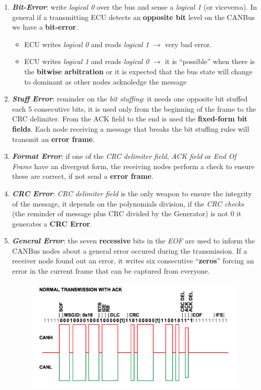 \begin{enumerate}[nosep]
    \item \textbf{\textit{Bit-Error}}: write \textit{logical 0} over the bus and sense a \textit{logical 1} (or viceversa). In general if a transmitting ECU detects an \textbf{opposite bit} level on the CANBus we have a \textbf{bit-error}.
    \begin{itemize}[nosep]
        \item ECU writes \textit{logical 0} and reads \textit{logical 1} $\rightarrow$ very bad error.
        \item ECU writes \textit{logical 1} and reads \textit{logical 0} $\rightarrow$ it is ``possible'' when there is the \textbf{bitwise arbitration} or it is expected that the bus state will change to dominant as other nodes acknoledge the message
    \end{itemize}
    \item \textbf{\textit{Stuff Error}}: reminder on the \textit{bit stuffing}: it needs one opposite bit stuffed each 5 consecutive bits, it is used only from the beginning of the frame to the CRC delimiter. From the ACK field to the end is used the \textbf{fixed-form bit fields}. Each node receiving a message that breaks the bit stuffing rules will transmit an \textbf{error frame}.
    \item \textbf{\textit{Format Error}}: if one of the \textit{CRC delimiter field}, \textit{ACK field} or \textit{End Of Frame} have an divergent form, the receiving nodes perform a check to ensure these are correct, if not send a \textbf{error frame}.
    \item \textbf{\textit{CRC Error}}: \textit{CRC delimiter field} is the only weapon to ensure the integrity of the message, it depends on the polynomials division, if the \textit{CRC checks} (the reminder of message plus CRC divided by the Generator) is not $0$ it generates a \textbf{CRC Error}.
    \item \textbf{\textit{General Error}}: the seven \textbf{recessive} bits in the \textit{EOF} are used to inform the CANBus nodes about a general error occured during the transmission. If a receiver node found out an error, it writes six consecutive ``\textbf{zeros}'' forcing an error in the current frame that can be captured from everyone.
    \begin{figure}[h]
        \centering
        \begin{minipage}[t]{0.45\textwidth}
            \centering
            \includegraphics[width=\textwidth]{img/ok_ack}

\end{minipage}
\end{figure}
\end{enumerate}
